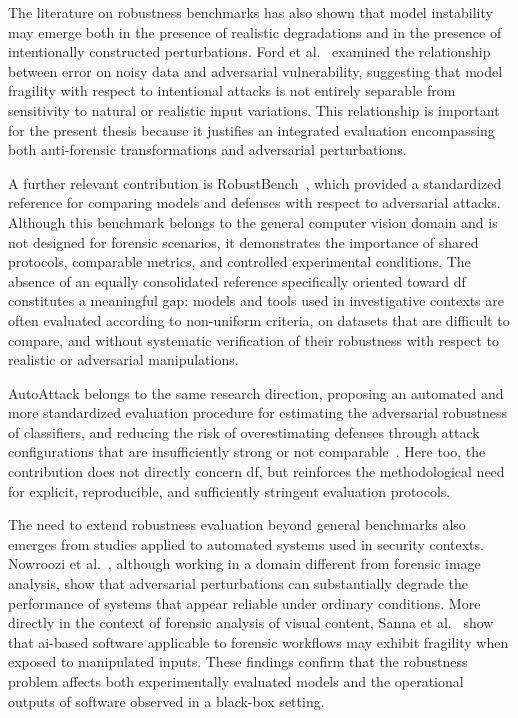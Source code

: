 The literature on robustness benchmarks has also shown that model instability
may emerge both in the presence of realistic degradations and in the presence
of intentionally constructed perturbations. Ford et
al.~\cite{ford2019adversarial} examined the relationship between error on noisy
data and adversarial vulnerability, suggesting that model fragility with respect
to intentional attacks is not entirely separable from sensitivity to natural or
realistic input variations. This relationship is important for the present
thesis because it justifies an integrated evaluation encompassing both
anti-forensic transformations and adversarial perturbations.

A further relevant contribution is RobustBench~\cite{croce2020robustbench},
which provided a standardized reference for comparing models and defenses with
respect to adversarial attacks. Although this benchmark belongs to the general
computer vision domain and is not designed for forensic scenarios, it
demonstrates the importance of shared protocols, comparable metrics, and
controlled experimental conditions. The absence of an equally consolidated
reference specifically oriented toward \gls{df} constitutes a meaningful gap:
models and tools used in investigative contexts are often evaluated according
to non-uniform criteria, on datasets that are difficult to compare, and without
systematic verification of their robustness with respect to realistic or
adversarial manipulations.

AutoAttack belongs to the same research direction, proposing an automated and
more standardized evaluation procedure for estimating the adversarial
robustness of classifiers, and reducing the risk of overestimating defenses
through attack configurations that are insufficiently strong or not
comparable~\cite{croce2020autoattack}. Here too, the contribution does not
directly concern \gls{df}, but reinforces the methodological need for explicit,
reproducible, and sufficiently stringent evaluation protocols.

The need to extend robustness evaluation beyond general benchmarks also emerges
from studies applied to automated systems used in security contexts. Nowroozi
et al.~\cite{nowroozi2024verifying}, although working in a domain different
from forensic image analysis, show that adversarial perturbations can
substantially degrade the performance of systems that appear reliable under
ordinary conditions. More directly in the context of forensic analysis of
visual content, Sanna et
al.~\cite{sanna2024preliminary,sanna2025pixelperfect} show that \gls{ai}-based
software applicable to forensic workflows may exhibit fragility when exposed to
manipulated inputs. These findings confirm that the robustness problem affects
both experimentally evaluated models and the operational outputs of software
observed in a black-box setting.


